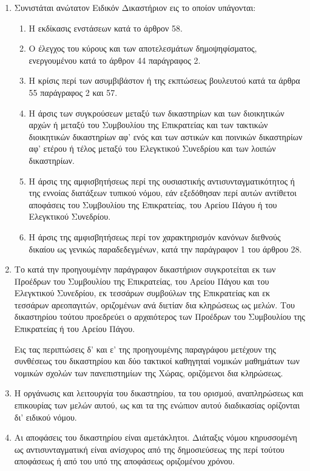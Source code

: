 \documentclass[twoside, a4paper, 10pt]{article}
\begin{document}
\begin{multicols}{2}
\begin{enumerate}
\begin{BigQuote}
\begin{enumerate}
  \item[1.] Συνιστάται ανώτατον Ειδικόν Δικαστήριον εις το οποίον υπάγονται:
\begin{enumerate}
  	\item[α)] Η εκδίκασις ενστάσεων κατά το άρθρον 58.
  	\item[β)] Ο έλεγχος του κύρους και των αποτελεσμάτων δημοψηφίσματος, ενεργουμένου κατά το άρθρον 44 παράγραφος 2.
  	\item[γ)] Η κρίσις περί των ασυμβιβάστον ή της εκπτώσεως βουλευτού κατά τα άρθρα 55 παράγραφος 2 και 57.
  	\item[δ)] Η άρσις των συγκρούσεων μεταξύ των δικαστηρίων και των διοικητικών αρχών ή μεταξύ του Συμβουλίου της Επικρατείας και των τακτικών διοικητικών δικαστηρίων αφ' ενός και των αστικών και ποινικών δικαστηρίων αφ' ετέρου ή τέλος μεταξύ του Ελεγκτικού Συνεδρίου και των λοιπών δικαστηρίων.
  	\item[ε)] Η άρσις της αμφισβητήσεως περί της ουσιαστικής αντισυνταγματικότητος ή της εννοίας διατάξεων τυπικού νόμου, εάν εξεδόθησαν περί αυτών αντίθετοι αποφάσεις του Συμβουλίου της Επικρατείας, του Αρείου Πάγου ή του Ελεγκτικού Συνεδρίου.
  	\item[στ)] Η άρσις της αμφισβητήσεως περί τον χαρακτηρισμόν κανόνων διεθνούς δικαίου ως γενικώς παραδεδεγμένων, κατά την παράγραφον 1 του άρθρου 28.
	\end{enumerate}
  \item[2.] Το κατά την προηγουμένην παράγραφον δικαστήριον συγκροτείται εκ των Προέδρων του Συμβουλίου της Επικρατείας, του Αρείου Πάγου και του Ελεγκτικού Συνεδρίου, εκ τεσσάρων συμβούλων της Επικρατείας και εκ τεσσάρων αρεοπαγιτών, οριζομένων ανά διετίαν δια κληρώσεως ως μελών. Του δικαστηρίου τούτου προεδρεύει ο αρχαιότερος των Προέδρων του Συμβουλίου της Επικρατείας ή του Αρείου Πάγου.

	Εις τας περιπτώσεις δ' και ε' της προηγουμένης παραγράφου μετέχουν της συνθέσεως του δικαστηρίου και δύο τακτικοί καθηγηταί νομικών μαθημάτων των νομικών σχολών των πανεπιστημίων της Χώρας, οριζόμενοι δια κληρώσεως.
  \item[3.] Η οργάνωσις και λειτουργία του δικαστηρίου, τα του ορισμού, αναπληρώσεως και επικουρίας των μελών αυτού, ως και τα της ενώπιον αυτού διαδικασίας ορίζονται δι' ειδικού νόμου.
  \item[4.] Αι αποφάσεις του δικαστηρίου είναι αμετάκλητοι.
	Διάταξις νόμου κηρυσσομένη ως αντισυνταγματική είναι ανίσχυρος από της δημοσιεύσεως της περί τούτου αποφάσεως ή από του υπό της αποφάσεως οριζομένου χρόνου.
\end{enumerate}


\end{BigQuote}
\end{enumerate}
\end{multicols}
\end{document}

